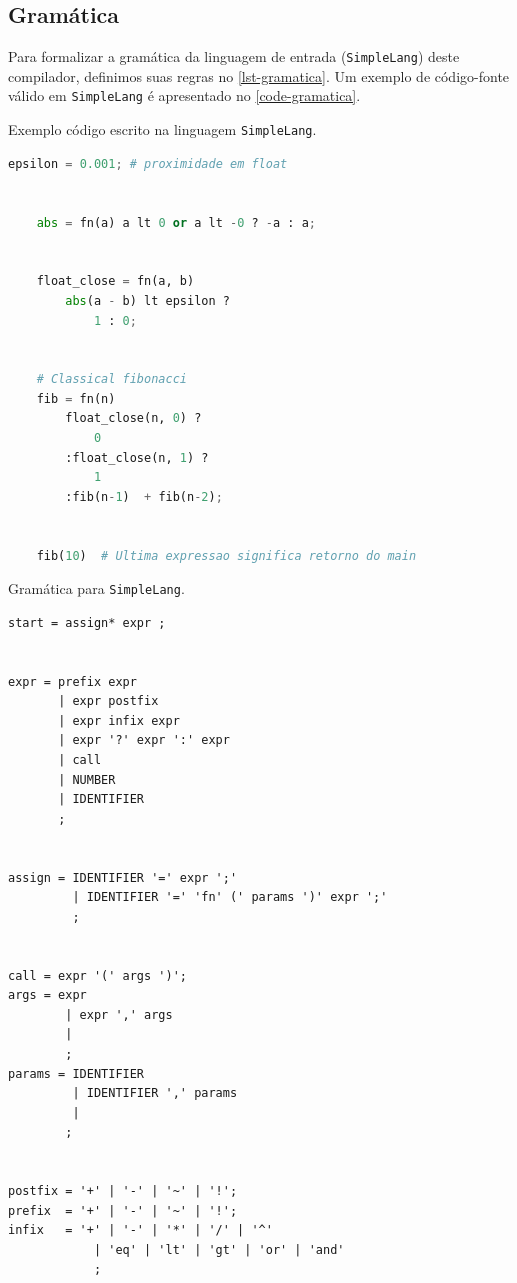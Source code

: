 \documentclass[english, 
               brazil, 
               bsc] %
               {dcomp-abntex2}
\begin{document}
\subsection{Gramática}

Para formalizar a gramática da linguagem de entrada (\texttt{SimpleLang}) deste compilador, definimos suas regras no \autoref{lst-gramatica}. Um exemplo de código-fonte válido em \texttt{SimpleLang} é apresentado no \autoref{code-gramatica}.


\begin{codigo}[htb]
        \caption{\small Exemplo código escrito na linguagem \texttt{SimpleLang}. }
        \label{code-gramatica}
  \begin{lstlisting}[language = python]
    epsilon = 0.001; # proximidade em float


    abs = fn(a) a lt 0 or a lt -0 ? -a : a;


    float_close = fn(a, b) 
        abs(a - b) lt epsilon ? 
            1 : 0;


    # Classical fibonacci
    fib = fn(n)  
        float_close(n, 0) ? 
            0
        :float_close(n, 1) ?
            1
        :fib(n-1)  + fib(n-2);


    fib(10)  # Ultima expressao significa retorno do main
  \end{lstlisting}
\end{codigo}

\begin{codigo}[H]
        \caption{\small Gramática para \texttt{SimpleLang}.}
        \label{lst-gramatica}
\begin{lstlisting}[numbers=none, frame=none]
start = assign* expr ;


expr = prefix expr 
       | expr postfix  
       | expr infix expr 
       | expr '?' expr ':' expr
       | call
       | NUMBER
       | IDENTIFIER
       ;


assign = IDENTIFIER '=' expr ';'
         | IDENTIFIER '=' 'fn' (' params ')' expr ';'
         ; 


call = expr '(' args ')';
args = expr
        | expr ',' args
        | 
        ;
params = IDENTIFIER
         | IDENTIFIER ',' params
         | 
        ;


postfix = '+' | '-' | '~' | '!';
prefix  = '+' | '-' | '~' | '!';
infix   = '+' | '-' | '*' | '/' | '^'
            | 'eq' | 'lt' | 'gt' | 'or' | 'and'
            ;
\end{lstlisting}
\end{codigo}
\end{document}
